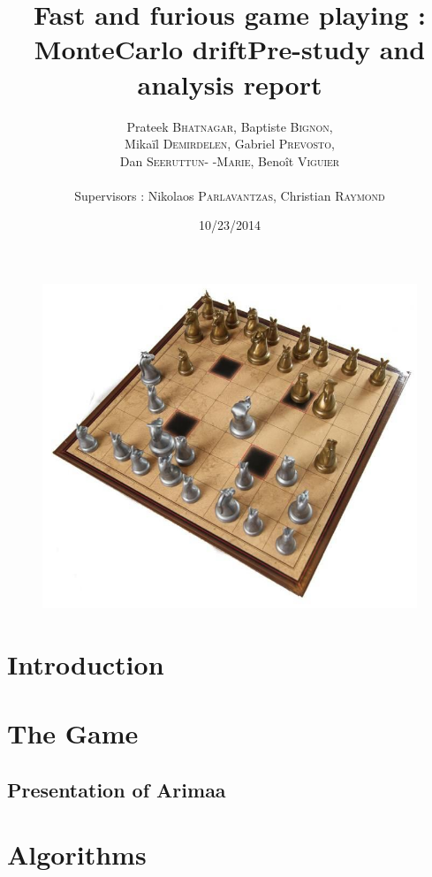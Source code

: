 \documentclass[12pt]{article}
\title{Fast and furious game playing : MonteCarlo drift\smallbreak Pre-study and analysis report}
\author{Prateek \textsc{Bhatnagar}, Baptiste \textsc{Bignon}, \\
        Mikaïl \textsc{Demirdelen}, Gabriel \textsc{Prevosto}, \\
        Dan \textsc{Seeruttun- -Marie}, Benoît \textsc{Viguier} \\
        \\
        Supervisors : Nikolaos \textsc{Parlavantzas}, Christian \textsc{Raymond}}
\date{10/23/2014}
\begin{document}
\maketitle

\begin{figure}[!h] 
\centerline{\includegraphics[scale=0.50]{img/arimaa}}
\end{figure}
\newpage
\begin{abstract}

\end{abstract}



\newpage
\tableofcontents
\newpage


\section*{Introduction}

\section{The Game}
\subsection{Presentation of Arimaa} 
\newpage
\section{Algorithms}
\end{document}

